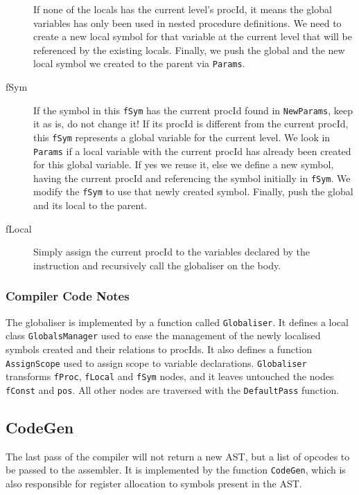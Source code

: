 \documentclass[a4paper]{memoir}
\begin{document}
\begin{description}
      If none of the locals has the current level's procId, it means the global variables has only been used in nested procedure definitions. We need to create a new local symbol for that variable at the current level that will be referenced by the existing locals. Finally, we push the global and the new local symbol we created to the parent via \lstinline!Params!. 
   \item[fSym] If the symbol in this \lstinline!fSym! has the current procId found in \lstinline!NewParams!, keep it as is, do not change it!  If its procId is different from the current procId, this \lstinline!fSym! represents a global variable for the current level. We look in \lstinline!Params! if a local variable with the current procId has already been created for this global variable. If yes we reuse it, else we define a new symbol, having the current procId and referencing the symbol initially in \lstinline!fSym!. We modify the \lstinline!fSym! to use that newly created symbol. Finally, push the global and its local to the parent.
   \item[fLocal] Simply assign the current procId to the variables declared by the instruction and recursively call the globaliser on the body.
\end{description}

\subsubsection{Compiler Code Notes}
The globaliser is implemented by a function called \lstinline!Globaliser!. It
defines a local class \lstinline!GlobalsManager! used to ease the management of
the newly localised symbols created and their relations to procIds. It also
defines a function \lstinline!AssignScope! used to assign scope to variable
declarations. \lstinline!Globaliser! transforms \lstinline!fProc!,
\lstinline!fLocal! and \lstinline!fSym! nodes, and it leaves untouched the nodes
\lstinline!fConst! and \lstinline!pos!. All other nodes are traversed with the
\lstinline!DefaultPass! function.

\subsection{CodeGen}\label{sec:arch:codegen}
The last pass of the compiler will not return a new AST, but a list of opcodes to be passed to the assembler. It is implemented by the function \lstinline!CodeGen!, which is also responsible for register allocation to symbols present in the AST.
\end{document}
